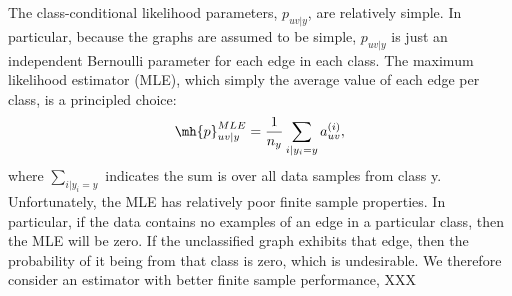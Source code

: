 \documentclass[10pt,journal,cspaper,compsoc]{IEEEtran}
\begin{document}
The class-conditional likelihood parameters, $p_{uv|y}$, are relatively simple.  In particular, because the graphs are assumed to be simple, $p_{uv|y}$ is just an independent Bernoulli parameter for each edge in each class.  The maximum likelihood estimator (MLE), which simply the average value of each edge per class, is a principled choice:
\begin{align}
\mh{p}_{uv|y}^{MLE} = \frac{1}{n_y} \sum_{i | y_i = y} a_{uv}^{(i)},
\end{align}
where $\sum_{i | y_i=y}$ indicates the sum is over all data samples from class y. Unfortunately, the MLE has relatively poor finite sample properties.  In particular, if the data contains no examples of an edge in a particular class, then the MLE will be zero.  If the unclassified graph exhibits that edge, then the probability of it being from that class is zero, which is undesirable. We therefore consider an estimator with better finite sample performance, XXX 

\end{document}
